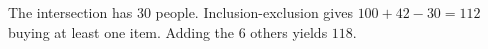The intersection has 30 people. Inclusion-exclusion gives $100+42-30=112$ buying at least one item. Adding the 6 others yields $\boxed{118}$.
